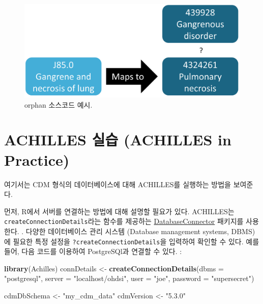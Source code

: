 \documentclass[11pt]{book}
\newenvironment{Shaded}{\begin{snugshade}}{\end{snugshade}}
\newcommand{\KeywordTok}[1]{\textcolor[rgb]{0.13,0.29,0.53}{\textbf{#1}}}
\newcommand{\DataTypeTok}[1]{\textcolor[rgb]{0.13,0.29,0.53}{#1}}
\newcommand{\StringTok}[1]{\textcolor[rgb]{0.31,0.60,0.02}{#1}}
\newcommand{\NormalTok}[1]{#1}
\theoremstyle{definition}
\theoremstyle{definition}
\theoremstyle{definition}
\theoremstyle{remark}
\begin{document}
\begin{figure}

{\centering \includegraphics[width=0.7\linewidth]{images/DataQuality/missingMapping} 

}

\caption{orphan 소스코드 예시. }\label{fig:missingMapping}
\end{figure}

\section{ACHILLES 실습 (ACHILLES in Practice)}\label{achillesInPractice}

여기서는 CDM 형식의 데이터베이스에 대해 ACHILLES를 실행하는 방법을
보여준다.

먼저, R에서 서버를 연결하는 방법에 대해 설명할 필요가 있다. ACHILLES는
\texttt{createConnectionDetails}라는 함수를 제공하는
\href{https://ohdsi.github.io/DatabaseConnector/}{DatabaseConnector}
패키지를 사용한다. . 다양한 데이터베이스 관리 시스템 (Database
management systems, DBMS)에 필요한 특정 설정을
\texttt{?createConnectionDetails}을 입력하여 확인할 수 있다. 예를 들어,
다음 코드를 이용하여 PostgreSQl과 연결할 수 있다. :

\begin{Shaded}
\begin{Highlighting}[]
\KeywordTok{library}\NormalTok{(Achilles)}
\NormalTok{connDetails <-}\StringTok{ }\KeywordTok{createConnectionDetails}\NormalTok{(}\DataTypeTok{dbms =} \StringTok{"postgresql"}\NormalTok{,}
                                       \DataTypeTok{server =} \StringTok{"localhost/ohdsi"}\NormalTok{,}
                                       \DataTypeTok{user =} \StringTok{"joe"}\NormalTok{,}
                                       \DataTypeTok{password =} \StringTok{"supersecret"}\NormalTok{)}

\NormalTok{cdmDbSchema <-}\StringTok{ "my_cdm_data"}
\NormalTok{cdmVersion <-}\StringTok{ "5.3.0"}
\end{Highlighting}
\end{Shaded}
\end{document}
